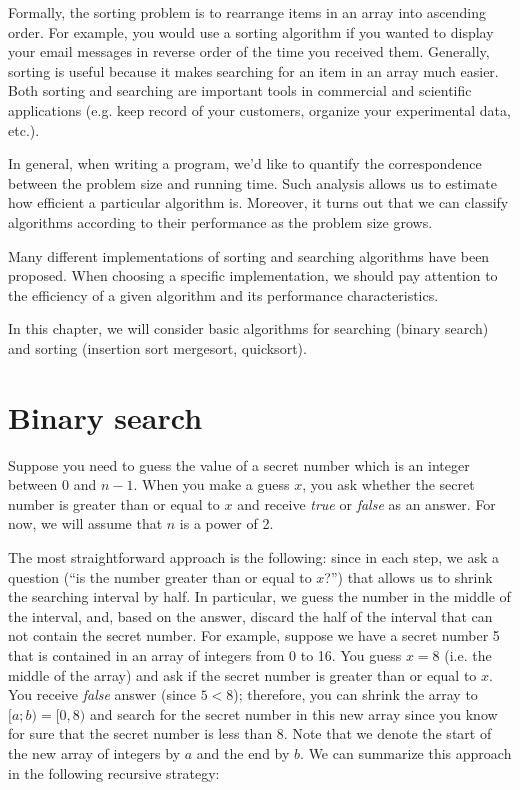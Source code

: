  
 Formally, the sorting problem is to rearrange items in an array into ascending order. For example, you would use a sorting algorithm if you wanted to display your email messages in reverse order of the time you received them. Generally, sorting is useful because it makes searching for an item in an array much easier. Both sorting and searching are important tools in commercial and scientific applications (e.g. keep record of your customers, organize your experimental data, etc.).

In general, when writing a program, we’d like to quantify the correspondence between the problem size and running time. Such analysis allows us to estimate how efficient a particular algorithm is. Moreover, it turns out that we can classify algorithms according to their performance as the problem size grows.

Many different implementations of sorting and searching algorithms have been proposed. When choosing a specific implementation, we should pay attention to the efficiency of a given algorithm and its performance characteristics. 

In this chapter, we will consider basic algorithms for searching (binary search) and sorting (insertion sort mergesort, quicksort).  



\section{Binary search}

Suppose you need to guess the value of a secret number which is an integer between 0 and $n-1$. When you make a guess $x$, you ask whether the secret number is greater than or equal to $x$ and receive \textit{true} or \textit{false} as an answer. For now, we will assume that $n$ is a power of 2.

The most straightforward approach is the following: since in each step, we ask a question (“is the number greater than or equal to $x$?”) that allows us to shrink the searching interval by half. In particular, we guess the number in the middle of the interval, and, based on the answer, discard the half of the interval that can not contain the secret number. For example, suppose we have a secret number 5 that is contained in an array of integers from 0 to 16. You guess $x=8$ (i.e. the middle of the array) and ask if the secret number is greater than or equal to $x$. You receive \textit{false} answer (since $5 < 8$); therefore, you can shrink the array to $[a;b) = [0, 8)$ and search for the secret number in this new array since you know for sure that the secret number is less than 8. Note that we denote the start of the new array of integers by $a$ and the end by $b$.  
We can summarize this approach in the following recursive strategy:

